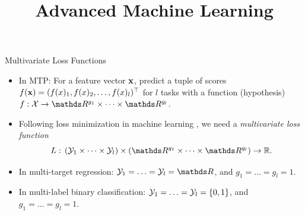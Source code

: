 \documentclass[11pt,compress,t,notes=noshow, xcolor=table]{beamer}
\title{Advanced Machine Learning}
\date{}
\begin{document}



\sloppy


\begin{frame}{Multivariate Loss Functions}
	\begin{itemize}
		\item In MTP: For a feature vector $\mathbf{x}$, predict a tuple of scores $f(\mathbf{x}) = (f(x)_1, f(x)_2, \ldots, f(x)_l)^\top$ for $l$ tasks with a function (hypothesis) $f: \Xspace \rightarrow \R^{g_1} \times \cdots \times \R^{g_l} $.
        
		\item Following loss minimization in machine learning , we need a \emph{multivariate loss function} 
		$$
		L: \, (\Yspace_1 \times \cdots \times \Yspace_l) \times (\R^{g_1} \times \cdots \times \R^{g_l}) \rightarrow \mathbb{R}.
		$$ 

        \item In multi-target regression: $\Yspace_1 = \ldots = \Yspace_l = \R$, and $g_1 = \ldots = g_l = 1$.

        \item In multi-label binary classification: $\mathcal{Y}_1 =  \ldots = \mathcal{Y}_l = \{0, 1\}$, and $g_1 = \ldots = g_l = 1$. %
	\end{itemize}
	
\end{frame}
\end{document}
